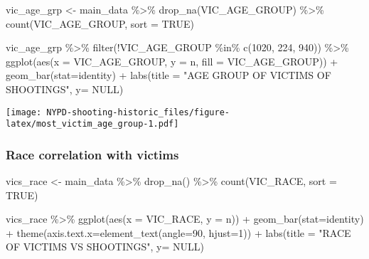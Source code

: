\documentclass[
]{article}
\newenvironment{Shaded}{\begin{snugshade}}{\end{snugshade}}
\newcommand{\AttributeTok}[1]{\textcolor[rgb]{0.77,0.63,0.00}{#1}}
\newcommand{\ConstantTok}[1]{\textcolor[rgb]{0.00,0.00,0.00}{#1}}
\newcommand{\DecValTok}[1]{\textcolor[rgb]{0.00,0.00,0.81}{#1}}
\newcommand{\FunctionTok}[1]{\textcolor[rgb]{0.00,0.00,0.00}{#1}}
\newcommand{\NormalTok}[1]{#1}
\newcommand{\OtherTok}[1]{\textcolor[rgb]{0.56,0.35,0.01}{#1}}
\newcommand{\SpecialCharTok}[1]{\textcolor[rgb]{0.00,0.00,0.00}{#1}}
\newcommand{\StringTok}[1]{\textcolor[rgb]{0.31,0.60,0.02}{#1}}
\begin{document}
\begin{Shaded}
\begin{Highlighting}[]
\NormalTok{vic\_age\_grp }\OtherTok{\textless{}{-}}\NormalTok{ main\_data }\SpecialCharTok{\%\textgreater{}\%} \FunctionTok{drop\_na}\NormalTok{(VIC\_AGE\_GROUP) }\SpecialCharTok{\%\textgreater{}\%} \FunctionTok{count}\NormalTok{(VIC\_AGE\_GROUP, }\AttributeTok{sort =} \ConstantTok{TRUE}\NormalTok{)}

\NormalTok{vic\_age\_grp }\SpecialCharTok{\%\textgreater{}\%} \FunctionTok{filter}\NormalTok{(}\SpecialCharTok{!}\NormalTok{VIC\_AGE\_GROUP }\SpecialCharTok{\%in\%} \FunctionTok{c}\NormalTok{(}\StringTok{\textquotesingle{}1020\textquotesingle{}}\NormalTok{, }\StringTok{\textquotesingle{}224\textquotesingle{}}\NormalTok{, }\StringTok{\textquotesingle{}940\textquotesingle{}}\NormalTok{)) }\SpecialCharTok{\%\textgreater{}\%} \FunctionTok{ggplot}\NormalTok{(}\FunctionTok{aes}\NormalTok{(}\AttributeTok{x =}\NormalTok{ VIC\_AGE\_GROUP, }\AttributeTok{y =}\NormalTok{ n, }\AttributeTok{fill =}\NormalTok{ VIC\_AGE\_GROUP)) }\SpecialCharTok{+} \FunctionTok{geom\_bar}\NormalTok{(}\AttributeTok{stat=}\StringTok{\textquotesingle{}identity\textquotesingle{}}\NormalTok{) }\SpecialCharTok{+} \FunctionTok{labs}\NormalTok{(}\AttributeTok{title =} \StringTok{"AGE GROUP OF VICTIMS OF SHOOTINGS"}\NormalTok{, }\AttributeTok{y=} \ConstantTok{NULL}\NormalTok{)}
\end{Highlighting}
\end{Shaded}

\texttt{[image: NYPD-shooting-historic\_files/figure-latex/most\_victim\_age\_group-1.pdf]}

\hypertarget{race-correlation-with-victims}{%
\subsubsection{Race correlation with
victims}\label{race-correlation-with-victims}}

\begin{Shaded}
\begin{Highlighting}[]
\NormalTok{vics\_race }\OtherTok{\textless{}{-}}\NormalTok{ main\_data }\SpecialCharTok{\%\textgreater{}\%} \FunctionTok{drop\_na}\NormalTok{() }\SpecialCharTok{\%\textgreater{}\%} \FunctionTok{count}\NormalTok{(VIC\_RACE, }\AttributeTok{sort =} \ConstantTok{TRUE}\NormalTok{)}

\NormalTok{vics\_race }\SpecialCharTok{\%\textgreater{}\%} \FunctionTok{ggplot}\NormalTok{(}\FunctionTok{aes}\NormalTok{(}\AttributeTok{x =}\NormalTok{ VIC\_RACE, }\AttributeTok{y =}\NormalTok{ n)) }\SpecialCharTok{+} \FunctionTok{geom\_bar}\NormalTok{(}\AttributeTok{stat=}\StringTok{\textquotesingle{}identity\textquotesingle{}}\NormalTok{) }\SpecialCharTok{+} \FunctionTok{theme}\NormalTok{(}\AttributeTok{axis.text.x=}\FunctionTok{element\_text}\NormalTok{(}\AttributeTok{angle=}\DecValTok{90}\NormalTok{, }\AttributeTok{hjust=}\DecValTok{1}\NormalTok{)) }\SpecialCharTok{+} \FunctionTok{labs}\NormalTok{(}\AttributeTok{title =} \StringTok{"RACE OF VICTIMS VS SHOOTINGS"}\NormalTok{, }\AttributeTok{y=} \ConstantTok{NULL}\NormalTok{)}
\end{Highlighting}
\end{Shaded}
\end{document}

